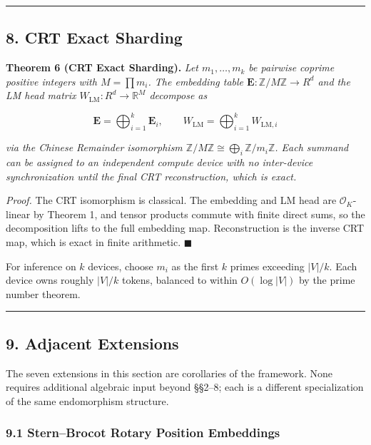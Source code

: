 \documentclass[
  11pt,
]{article}
\begin{document}
\begin{center}\rule{0.5\linewidth}{0.5pt}\end{center}

\hypertarget{crt-exact-sharding}{%
\subsection{8. CRT Exact Sharding}\label{crt-exact-sharding}}

\textbf{Theorem 6 (CRT Exact Sharding).} \emph{Let \(m_1, \dots, m_k\)
be pairwise coprime positive integers with \(M = \prod m_i\). The
embedding table \(\mathbf{E} : \mathbb{Z}/M\mathbb{Z} \to R^d\) and the
LM head matrix \(W_{\mathrm{LM}} : R^d \to \mathbb{R}^M\) decompose as}

\[\mathbf{E} = \bigoplus_{i=1}^k \mathbf{E}_i, \qquad W_{\mathrm{LM}} = \bigoplus_{i=1}^k W_{\mathrm{LM}, i}\]

\emph{via the Chinese Remainder isomorphism
\(\mathbb{Z}/M\mathbb{Z} \cong \bigoplus_i \mathbb{Z}/m_i\mathbb{Z}\).
Each summand can be assigned to an independent compute device with no
inter-device synchronization until the final CRT reconstruction, which
is exact.}

\emph{Proof.} The CRT isomorphism is classical. The embedding and LM
head are \(\mathcal{O}_K\)-linear by Theorem 1, and tensor products
commute with finite direct sums, so the decomposition lifts to the full
embedding map. Reconstruction is the inverse CRT map, which is exact in
finite arithmetic. \(\blacksquare\)

For inference on \(k\) devices, choose \(m_i\) as the first \(k\) primes
exceeding \(|V|/k\). Each device owns roughly \(|V|/k\) tokens, balanced
to within \(O(\log |V|)\) by the prime number theorem.

\begin{center}\rule{0.5\linewidth}{0.5pt}\end{center}

\hypertarget{adjacent-extensions}{%
\subsection{9. Adjacent Extensions}\label{adjacent-extensions}}

The seven extensions in this section are corollaries of the framework.
None requires additional algebraic input beyond §§2--8; each is a
different specialization of the same endomorphism structure.

\hypertarget{sternbrocot-rotary-position-embeddings}{%
\subsubsection{9.1 Stern--Brocot Rotary Position
Embeddings}\label{sternbrocot-rotary-position-embeddings}}
\end{document}
